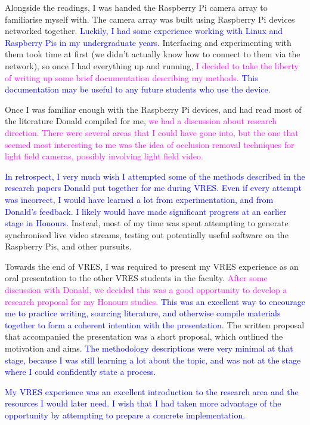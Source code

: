 \documentclass[a4paper, 12pt]{article}
\begin{document}
Alongside the readings, I was handed the Raspberry Pi camera array to familiarise myself with. The camera array was built using Raspberry Pi devices networked together. \textcolor{Blue}{Luckily, I had some experience working with Linux and Raspberry Pis in my undergraduate years.} Interfacing and experimenting with them took time at first (we didn't actually know how to connect to them via the network), so once I had everything up and running, \textcolor{Magenta}{I decided to take the liberty of writing up some brief documentation describing my methods.} \textcolor{Blue}{This documentation may be useful to any future students who use the device.}

Once I was familiar enough with the Raspberry Pi devices, and had read most of the literature Donald compiled for me, \textcolor{Magenta}{we had a discussion about research direction. There were several areas that I could have gone into, but the one that seemed most interesting to me was the idea of occlusion removal techniques for light field cameras, possibly involving light field video.}

\textcolor{Blue}{In retrospect, I very much wish I attempted some of the methods described in the research papers Donald put together for me during VRES. Even if every attempt was incorrect, I would have learned a lot from experimentation, and from Donald's feedback. I likely would have made significant progress at an earlier stage in Honours.} Instead, most of my time was spent attempting to generate synchronised live video streams, testing out potentially useful software on the Raspberry Pis, and other pursuits.

Towards the end of VRES, I was required to present my VRES experience as an oral presentation to the other VRES students in the faculty. \textcolor{Magenta}{After some discussion with Donald, we decided this was a good opportunity to develop a research proposal for my Honours studies.} \textcolor{Blue}{This was an excellent way to encourage me to practice writing, sourcing literature, and otherwise compile materials together to form a coherent intention with the presentation.} The written proposal that accompanied the presentation was a short proposal, which outlined the motivation and aims. \textcolor{Blue}{The methodology descriptions were very minimal at that stage, because I was still learning a lot about the topic, and was not at the stage where I could confidently state a process.}

\textcolor{Blue}{My VRES experience was an excellent introduction to the research area and the resources I would later need. I wish that I had taken more advantage of the opportunity by attempting to prepare a concrete implementation.}
\end{document}
